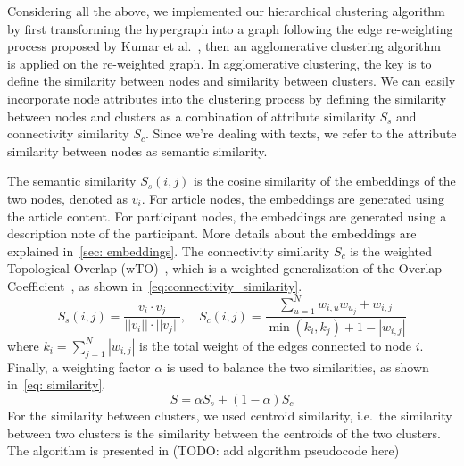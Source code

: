 Considering all the above, we implemented our hierarchical clustering algorithm by first transforming the hypergraph into a graph following the edge re-weighting process proposed by Kumar et al.~\cite{kumar2020new},
then an agglomerative clustering algorithm~\cite{steinbach2000doccluster} is applied on the re-weighted graph.
In agglomerative clustering, the key is to define the similarity between nodes and similarity between clusters.
We can easily incorporate node attributes into the clustering process by defining the similarity between nodes and clusters as a combination of attribute similarity $S_s$ and connectivity similarity $S_c$.
Since we're dealing with texts, we refer to the attribute similarity between nodes as semantic similarity. 

The semantic similarity $S_s(i, j)$ is the cosine similarity of the embeddings of the two nodes, denoted as $v_i$.
For article nodes, the embeddings are generated using the article content.
For participant nodes, the embeddings are generated using a description note of the participant.
More details about the embeddings are explained in~\autoref{sec: embeddings}.
The connectivity similarity $S_c$ is the weighted Topological Overlap (wTO)~\cite{gysi2018wto},
which is a weighted generalization of the Overlap Coefficient~\cite{vijaymeena2016survey}, as shown in~\autoref{eq:connectivity_similarity}.
\begin{equation}\label{eq:connectivity_similarity}
    S_s(i, j) = \frac{v_i \cdot v_j}{||v_i|| \cdot ||v_j||}, \quad
    S_c(i, j) = \frac{\sum_{u=1}^N{w_{i,u}w_{u_j}} + w_{i,j}}{\min(k_i, k_j) + 1 - |w_{i,j}|}
\end{equation}
where $k_i = \sum_{j=1}^N |w_{i,j}|$ is the total weight of the edges connected to node $i$.
Finally, a weighting factor $\alpha$ is used to balance the two similarities, as shown in~\autoref{eq: similarity}.
\begin{equation}\label{eq: similarity}
    S = \alpha S_s + (1-\alpha) S_c
\end{equation}
For the similarity between clusters, we used centroid similarity, i.e.\ the similarity between two clusters is the similarity between the centroids of the two clusters.
The algorithm is presented in (TODO: add algorithm pseudocode here)



